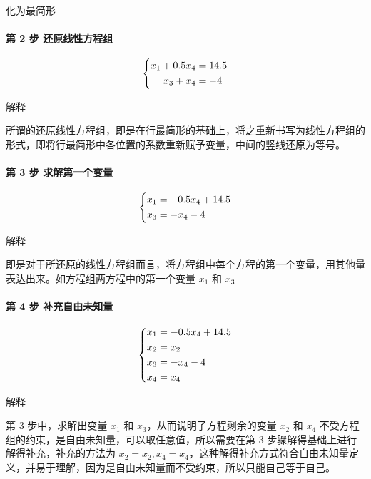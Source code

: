 化为最简形

\paragraph{第 2 步  还原线性方程组}

$$
\left\{\begin{aligned}
x_1+0.5x_4 &= 14.5 \notag\\
x_3+x_4 &= -4 \notag \\
\end{aligned}\right.
$$

解释

\begin{QUOTE}{}{}
所谓的还原线性方程组，即是在行最简形的基础上，将之重新书写为线性方程组的形式，即将行最简形中各位置的系数重新赋予变量，中间的竖线还原为等号。
\end{QUOTE}

\paragraph{第 3 步  求解第一个变量}

$$
\left\{\begin{aligned}
x_1 &= -0.5x_4+14.5\notag \\
x_3 &= -x_4-4\notag
\end{aligned}\right.
$$

解释

\begin{QUOTE}{}{}
即是对于所还原的线性方程组而言，将方程组中每个方程的第一个变量，用其他量表达出来。如方程组两方程中的第一个变量 $x_1$ 和 $x_3$
\end{QUOTE}

\paragraph{第 4 步  补充自由未知量}

$$
\left\{\begin{aligned}
x_1 &= -0.5x_4+14.5 \notag \\
x_2 &= x_2 \notag \\
x_3 &= -x_4-4 \notag \\
x_4 &= x_4 \notag
\end{aligned}\right.
$$

解释

\begin{QUOTE}{}{}
第 3 步中，求解出变量 $x_1$ 和 $x_3$，从而说明了方程剩余的变量 $x_2$ 和 $x_4$ 不受方程组的约束，是自由未知量，可以取任意值，所以需要在第 3 步骤解得基础上进行解得补充，补充的方法为 $x_2 = x_2,x_4 = x_4$，这种解得补充方式符合自由未知量定义，并易于理解，因为是自由未知量而不受约束，所以只能自己等于自己。
\end{QUOTE}

